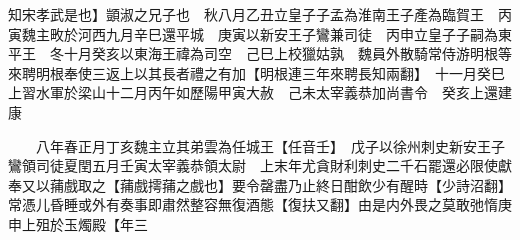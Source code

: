 知宋孝武是也】顗淑之兄子也　秋八月乙丑立皇子子孟為淮南王子產為臨賀王　丙寅魏主畋於河西九月辛巳還平城　庚寅以新安王子鸞兼司徒　丙申立皇子子嗣為東平王　冬十月癸亥以東海王禕為司空　己巳上校獵姑孰　魏員外散騎常侍游明根等來聘明根奉使三返上以其長者禮之有加【明根連三年來聘長知兩翻】　十一月癸巳上習水軍於梁山十二月丙午如歷陽甲寅大赦　己未太宰義恭加尚書令　癸亥上還建康

　　八年春正月丁亥魏主立其弟雲為任城王【任音壬】　戊子以徐州刺史新安王子鸞領司徒夏閏五月壬寅太宰義恭領太尉　上末年尤貪財利刺史二千石罷還必限使獻奉又以蒱戲取之【蒱戲摴蒱之戲也】要令罄盡乃止終日酣飲少有醒時【少詩沼翻】常憑儿昏睡或外有奏事即肅然整容無復酒態【復扶又翻】由是内外畏之莫敢弛惰庚申上殂於玉燭殿【年三
